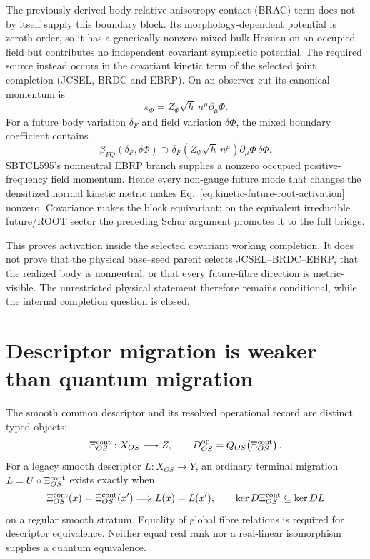 \documentclass[11pt]{article}
\begin{document}
The previously derived body-relative anisotropy contact (BRAC) term does not by itself supply this boundary
block. Its morphology-dependent potential is zeroth order, so it has a
generically nonzero mixed bulk Hessian on an occupied field but contributes no
independent covariant symplectic potential. The required source instead occurs
in the covariant kinetic term of the selected joint completion
(JCSEL, BRDC and EBRP). On an observer cut its canonical momentum is
\begin{equation}
 \pi_\Phi=Z_\Phi\sqrt h\,n^\mu\partial_\mu\Phi.
 \label{eq:body-dependent-field-momentum}
\end{equation}
For a future body variation $\delta_F$ and field variation $\delta\Phi$, the
mixed boundary coefficient contains
\begin{equation}
 \beta_{FQ}(\delta_F,\delta\Phi)
 \supset \delta_F\!\left(Z_\Phi\sqrt h\,n^\mu\right)
 \partial_\mu\Phi\,\delta\Phi.
 \label{eq:kinetic-future-root-activation}
\end{equation}
SBTCL595's nonneutral EBRP branch supplies a nonzero occupied
positive-frequency field momentum. Hence every non-gauge future mode that
changes the densitized normal kinetic metric makes
Eq.~\eqref{eq:kinetic-future-root-activation} nonzero. Covariance makes the
block equivariant; on the equivalent irreducible future/ROOT sector the
preceding Schur argument promotes it to the full bridge.

This proves activation inside the selected covariant working completion. It
does not prove that the physical base--seed parent selects JCSEL--BRDC--EBRP,
that the realized body is nonneutral, or that every future-fibre direction is
metric-visible. The unrestricted physical statement therefore remains conditional,
while the internal completion question is closed.

\section{Descriptor migration is weaker than quantum migration}

The smooth common descriptor and its resolved operational record are distinct
typed objects:
\begin{equation}
 \Xi^{\rm cont}_{OS}:X_{OS}\longrightarrow Z,
 \qquad
 D^{\rm op}_{OS}=Q_{OS}\!\left(\Xi^{\rm cont}_{OS}\right).
 \label{eq:papervi-continuous-operational-readout}
\end{equation}
For a legacy smooth descriptor \(L:X_{OS}\to Y\), an ordinary terminal
migration \(L=U\circ\Xi^{\rm cont}_{OS}\) exists exactly when
\begin{equation}
 \Xi^{\rm cont}_{OS}(x)=\Xi^{\rm cont}_{OS}(x')
 \Longrightarrow L(x)=L(x'),
 \qquad
 \ker D\Xi^{\rm cont}_{OS}\subseteq\ker DL
 \label{eq:papervi-mopr-migration}
\end{equation}
on a regular smooth stratum.  Equality of global fibre relations is required
for descriptor equivalence.  Neither equal real rank nor a real-linear
isomorphism supplies a quantum equivalence.
\end{document}
